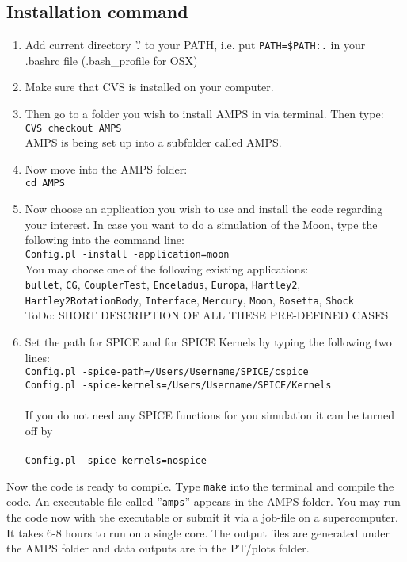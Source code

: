 \subsection {Installation command}
\begin{enumerate}
\item Add current directory '.' to your PATH, i.e. put  {\tt PATH=\$PATH:.} in your\\
.bashrc file (.bash\_profile for OSX)
\item Make sure that CVS is installed on your computer. 
\item Then go to a folder you wish to install AMPS in via terminal. Then type: \\
{\tt CVS checkout AMPS }\\
AMPS is being set up into a subfolder called AMPS.
\item Now move into the AMPS folder:\\
 {\tt cd AMPS}
\item Now choose an application you wish to use and install the code regarding your interest.
In case you want to do a simulation of the Moon, type the following into the command line:\\
{\tt Config.pl -install -application=moon}\\
You may choose one of the following existing applications:\\ 
{\tt  bullet}, {\tt CG}, {\tt CouplerTest}, {\tt Enceladus}, {\tt Europa}, {\tt Hartley2},
{\tt Hartley2RotationBody}, {\tt Interface}, {\tt Mercury}, {\tt Moon}, {\tt Rosetta}, {\tt Shock}\\
ToDo: SHORT DESCRIPTION OF ALL THESE PRE-DEFINED CASES
\item Set the path for SPICE and for SPICE Kernels by typing the following two lines:\\
{\tt Config.pl -spice-path=/Users/Username/SPICE/cspice }\\
{\tt Config.pl -spice-kernels=/Users/Username/SPICE/Kernels }\\\\
If you do not need any SPICE functions for you simulation it can be turned off by\\\\
{\tt Config.pl -spice-kernels=nospice}
\end{enumerate}
Now the code is ready to compile. Type {\tt make} into the terminal and compile the code. An executable file called ''{\tt amps}'' appears in the AMPS folder. You may run the code now with the executable or submit it via a job-file on a supercomputer. It takes 6-8 hours to run on a single core. The output files are generated under the AMPS folder and data outputs are in the PT/plots folder.

